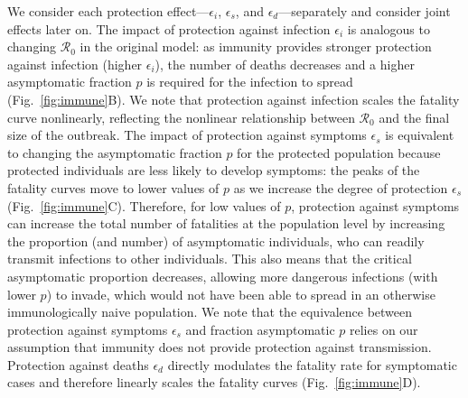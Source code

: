 \documentclass[12pt]{article}
\newcommand{\fref}[1]{Fig.~\ref{fig:#1}}
\newcommand{\RR}{\ensuremath{{\mathcal R}}\xspace}
\begin{document}
We consider each protection effect---$\epsilon_i$, $\epsilon_s$, and $\epsilon_d$---separately and consider joint effects later on.
The impact of protection against infection $\epsilon_i$ is analogous to changing $\RR_0$ in the original model: as immunity provides stronger protection against infection (higher $\epsilon_i$), the number of deaths decreases and a higher asymptomatic fraction $p$ is required for the infection to spread (\fref{immune}B).
We note that protection against infection scales the fatality curve nonlinearly, reflecting the nonlinear relationship between $\RR_0$ and the final size of the outbreak.
The impact of protection against symptoms $\epsilon_s$ is equivalent to changing the asymptomatic fraction $p$ for the protected population because protected individuals are less likely to develop symptoms:
the peaks of the fatality curves move to lower values of $p$ as we increase the degree of protection $\epsilon_s$ (\fref{immune}C).
Therefore, for low values of $p$, protection against symptoms can increase the total number of fatalities at the population level by increasing the proportion (and number) of asymptomatic individuals, who can readily transmit infections to other individuals.
This also means that the critical asymptomatic proportion decreases, allowing more dangerous infections (with lower $p$) to invade, which would not have been able to spread in an otherwise immunologically naive population.
We note that the equivalence between protection against symptoms $\epsilon_s$ and fraction asymptomatic $p$ relies on our assumption that immunity does not provide protection against transmission.
Protection against deaths $\epsilon_d$ directly modulates the fatality rate for symptomatic cases and therefore linearly scales the fatality curves (\fref{immune}D).
\end{document}
